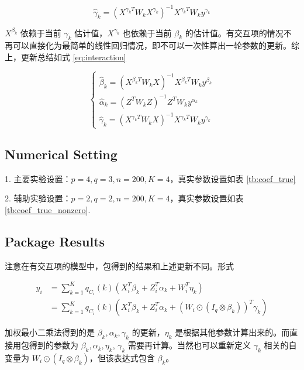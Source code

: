 \documentclass[12pt, a4paper, oneside]{article}
\numberwithin{equation}{section}
\begin{document}
\begin{equation}
	\hat \gamma_k = (X^{\gamma_k T} W_k X^{\gamma_k})^{-1} X^{\gamma_k T} W_k y^{\gamma_k}
\end{equation} 

$X^{\beta_k}$ 依赖于当前 $\gamma_k$ 估计值，$X^{\gamma_k}$ 也依赖于当前 $\beta_k$ 的估计值。有交互项的情况不再可以直接化为最简单的线性回归情况，即不可以一次性算出一轮参数的更新。综上，更新总结如式 \ref{eq:interaction}


\begin{equation}
	\left\{\begin{array}{l}
		\hat{\beta}_{k} = (X^{\beta_k T} W_k X)^{-1} X^{\beta_k T} W_k y^{\beta_k}\\
		\hat{\alpha}_{k} = (Z^T W_k Z)^{-1}Z^T W_k y^{\alpha_k}\\
		\hat{\gamma}_{k} = (X^{\gamma_k T} W_k X)^{-1} X^{\gamma_k T} W_k y^{\gamma_k}
	\end{array}\right.
	\label{eq:interaction}
\end{equation}

\subsection{Numerical Setting}

1. 主要实验设置：$p=4,q=3,n=200,K=4$，真实参数设置如表 \ref{tb:coef_true} 

2. 辅助实验设置：$p=2,q=2,n=200,K=4$，真实参数设置如表 \ref{tb:coef_true_nonzero}.

\subsection{Package Results}

注意在有交互项的模型中，包得到的结果和上述更新不同。形式 

\begin{equation}
	\begin{aligned}
		y_i &= \displaystyle\sum_{k=1}^{K} q_{C_i}(k) \left(X_i^T \beta_k + Z_i^T \alpha_k + W_i^T \eta_k\right) \\
		&= \displaystyle\sum_{k=1}^{K} q_{C_i}(k) \left(X_i^T \beta_k + Z_i^T \alpha_k + (W_i \odot (I_q \otimes \beta_k))^T \gamma_k\right)
	\end{aligned}
\end{equation}

加权最小二乘法得到的是 $\beta_k, \alpha_k, \gamma_k$ 的更新，$\eta_k$ 是根据其他参数计算出来的。而直接用包得到的参数为 $\beta_k, \alpha_k, \eta_k$, $\gamma_k$ 需要再计算。当然也可以重新定义 $\gamma_k$ 相关的自变量为 $W_i \odot (I_q \otimes \beta_k)$，但该表达式包含 $\beta_k$。
\end{document}
